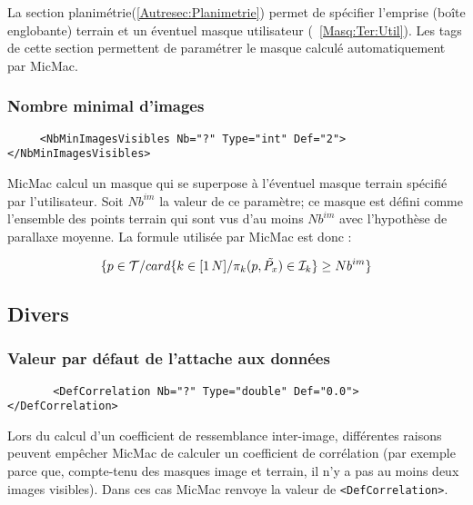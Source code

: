 \label{MEC:Masq}

La section planim\'etrie(\ref{Autresec:Planimetrie}) permet 
de sp\'ecifier l'emprise (bo\^ite englobante) terrain  et un
\'eventuel masque utilisateur (~\ref{Masq:Ter:Util}).
Les tags de cette section permettent de param\'etrer le
masque calcul\'e automatiquement par MicMac.


\subsubsection{Nombre minimal d'images}

\begin{verbatim}
     <NbMinImagesVisibles Nb="?" Type="int" Def="2"> </NbMinImagesVisibles>
\end{verbatim}



MicMac calcul un masque qui se superpose \`a l'\'eventuel
masque terrain sp\'ecifi\'e par l'utilisateur.
Soit $Nb^{im}$ la valeur de ce param\`etre;
ce masque est d\'efini comme l'ensemble des points
terrain qui sont vus d'au moins $Nb^{im}$ avec l'hypoth\`ese
de parallaxe moyenne. La formule utilis\'ee par MicMac
est donc :


\begin{equation}
        \{p\in\ETer / card\{k\in[1 \, N]/ \pi_{k}(p,\PxMoy) \in \EIm\} \geq Nb^{im}\}
\end{equation}



\subsection{Divers}
\subsubsection{Valeur par d\'efaut de l'attache aux donn\'ees}

\begin{verbatim}
       <DefCorrelation Nb="?" Type="double" Def="0.0"> </DefCorrelation>
\end{verbatim}

Lors du calcul d'un coefficient de ressemblance inter-image,
diff\'erentes raisons peuvent emp\^echer MicMac de calculer un
coefficient de corr\'elation (par exemple  parce que, compte-tenu
des masques image et terrain, il n'y a pas au moins deux images visibles).
Dans ces cas MicMac renvoye la valeur de {\tt <DefCorrelation>}.

